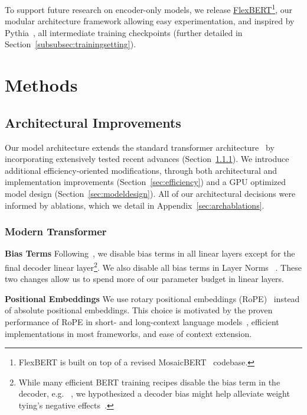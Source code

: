\documentclass[11pt]{article}
\begin{document}
To support future research on encoder-only models, we release \href{https://github.com/AnswerDotAI/ModernBERT}{FlexBERT}\footnote{FlexBERT is built on top of a revised MosaicBERT~\cite{mosaic} codebase.}, our modular architecture framework allowing easy experimentation, and inspired by Pythia~\cite{pythia}, all intermediate training checkpoints (further detailed in Section~\ref{subsubsec:trainingsetting}).

\section{Methods}

\subsection{Architectural Improvements}
\label{sec:arch}

Our model architecture extends the standard transformer architecture~\cite{DBLP:conf/nips/VaswaniSPUJGKP17} by incorporating extensively tested recent advances (Section~\ref{sec:transformerplusplus}). We introduce additional efficiency-oriented modifications, through both architectural and implementation improvements (Section~\ref{sec:efficiency}) and a GPU optimized model design (Section~\ref{sec:modeldesign}). All of our architectural decisions were informed by ablations, which we detail in Appendix~\ref{sec:archablations}.

\subsubsection{Modern Transformer}
\label{sec:transformerplusplus}

\textbf{Bias Terms} Following~\cite{Dayma_DALLE_Mini_2021}, we disable bias terms in all linear layers except for the final decoder linear layer\footnote{While many efficient BERT training recipes disable the bias term in the decoder, e.g. ~\citet{crammingbert}, we hypothesized a decoder bias might help alleviate weight tying's negative effects~\cite{RepresentationDP,improvinglowcomputelanguage}.}. We also disable all bias terms in Layer Norms ~\cite{disablelayernormbias}. These two changes allow us to spend more of our parameter budget in linear layers.

\textbf{Positional Embeddings} We use rotary positional embeddings (RoPE)~\cite{DBLP:journals/ijon/SuALPBL24} instead of absolute positional embeddings. This choice is motivated by the proven performance of RoPE in short- and long-context language models~\cite{neox,llama3,gemma2}, efficient implementations in most frameworks, and ease of context extension. 
\end{document}

